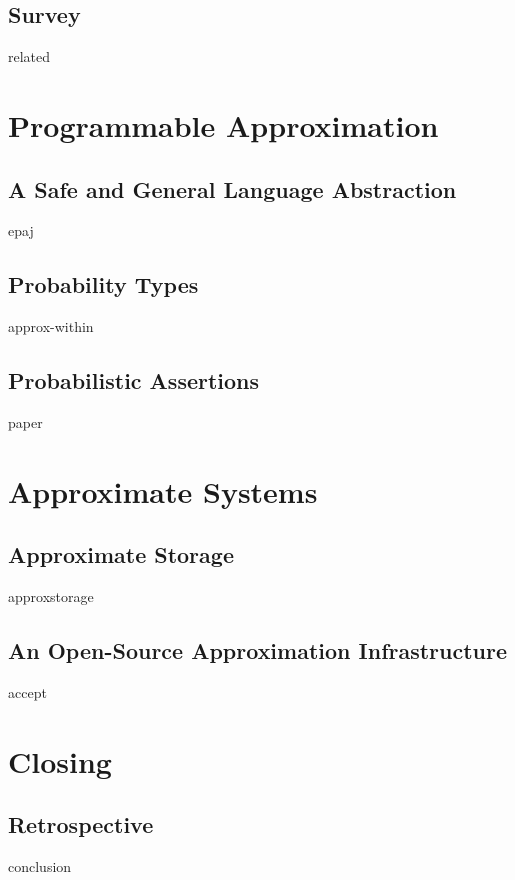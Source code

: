 \documentclass[ twoside,openright,titlepage,numbers=noenddot,headinclude,
                footinclude=true,cleardoublepage=empty,abstractoff,%
                BCOR=5mm,paper=letter,fontsize=11pt,letterpaper,%
                american,%
                ]{scrreprt}
\begin{document}
\chapter{Survey}
\label{ch:related}
{related}


\part{Programmable Approximation}
\label{part:programming}

\chapter{A Safe and General Language Abstraction}
\label{ch:enerj}
{epaj}


\chapter{Probability Types}
\label{ch:decaf}
{approx-within}


\chapter{Probabilistic Assertions}
\label{ch:passert}
{paper}



\part{Approximate Systems}
\label{part:systems}

\chapter{Approximate Storage}
\label{ch:approxstorage}
{approxstorage}


\chapter{An Open-Source Approximation Infrastructure}
\label{ch:accept}
{accept}


\part{Closing}
\label{part:conclusion}

\chapter{Retrospective}
\label{ch:conclusion}
{conclusion}
\end{document}
